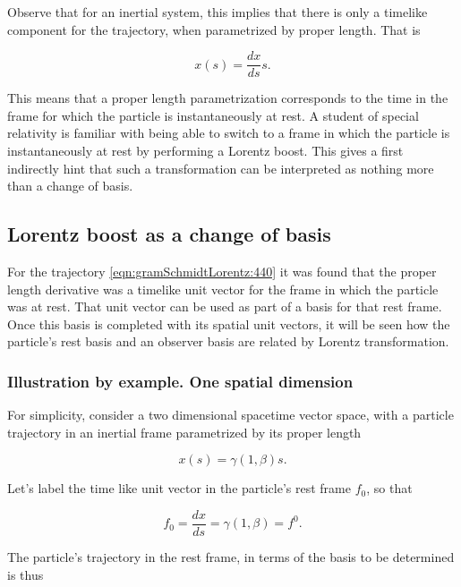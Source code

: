 Observe that for an inertial system, this implies that there is only a timelike component for the trajectory, when parametrized by proper length.  That is

\begin{equation}\label{eqn:gramSchmidtLorentz:580}
x(s) = \frac{dx}{ds} s.
\end{equation}

This means that a proper length parametrization corresponds to the time in the frame for which the particle is instantaneously at rest.  A student of special relativity is familiar with being able to switch to a frame in which the particle is instantaneously at rest by performing a Lorentz boost.  This gives a first indirectly hint that such a transformation can be interpreted as nothing more than a change of basis.

\subsection{Lorentz boost as a change of basis}

For the trajectory \ref{eqn:gramSchmidtLorentz:440} it was found that the proper length derivative was a timelike unit vector for the frame in which the particle was at rest.  That unit vector can be used as part of a basis for that rest frame.  Once this basis is completed with its spatial unit vectors, it will be seen how the particle's rest basis and an observer basis are related by Lorentz transformation.

\subsubsection{Illustration by example.  One spatial dimension}

For simplicity, consider a two dimensional spacetime vector space, with a particle trajectory in an inertial frame parametrized by its proper length

\begin{equation}\label{eqn:gramSchmidtLorentz:600}
x(s) = \gamma (1, \beta) s.
\end{equation}

Let's label the time like unit vector in the particle's rest frame $f_0$, so that

\begin{equation}\label{eqn:gramSchmidtLorentz:620}
f_0 = \frac{dx}{ds} = \gamma (1, \beta) = f^0.
\end{equation}

The particle's trajectory in the rest frame, in terms of the basis to be determined is thus

